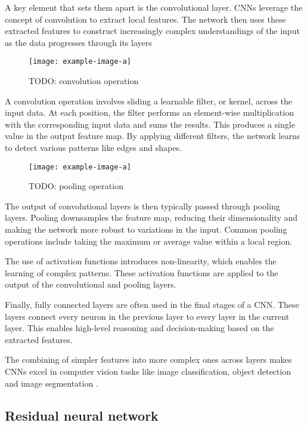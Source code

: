 A key element that sets them apart is the convolutional layer.
CNNs leverage the concept of convolution to extract local features.
The network then uses these extracted features to construct increasingly complex understandings of the input as the data progresses through its layers

\begin{figure}[hbtp]
    \centering    
    \texttt{[image: example-image-a]}
    \caption{TODO: convolution operation}
\end{figure}

A convolution operation involves sliding a learnable filter, or kernel, across the input data.
At each position, the filter performs an element-wise multiplication with the corresponding input data and sums the results.
This produces a single value in the output feature map.
By applying different filters, the network learns to detect various patterns like edges and shapes.

\begin{figure}[hbtp]
    \centering    
    \texttt{[image: example-image-a]}
    \caption{TODO: pooling operation}
\end{figure}

The output of convolutional layers is then typically passed through pooling layers.
Pooling downsamples the feature map, reducing their dimensionality and making the network more robust to variations in the input.
Common pooling operations include taking the maximum or average value within a local region. %

The use of activation functions introduces non-linearity, which enables the learning of complex patterns.
These activation functions are applied to the output of the convolutional and pooling layers.

Finally, fully connected layers are often used in the final stages of a CNN.
These layers connect every neuron in the previous layer to every layer in the current layer.
This enables high-level reasoning and decision-making based on the extracted features.

The combining of simpler features into more complex ones across layers makes CNNs excel in computer vision tasks like image classification, object detection and image segmentation \cite{}.

\subsection{Residual neural network}

